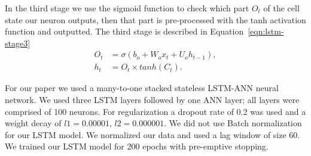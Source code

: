 \documentclass[12pt,journal,compsoc]{IEEEtran}
\begin{document}
\par In the third stage we use the sigmoid function to check which part $O_t$ of the cell state our neuron outputs,
then that part is pre-processed with the tanh activation function and outputted.
The third stage is described in Equation~\ref{eqn:lstm-stage3}
\begin{equation}
	\begin{aligned}
    O_t &= \sigma(b_o + W_o x_t + U_o h_{t-1}), \\
    h_t &= O_t \times tanh(C_t).
    \end{aligned}
    \label{eqn:lstm-stage3}
\end{equation}
\par For our paper we used a many-to-one stacked stateless LSTM-ANN neural network. 
We used three LSTM layers followed by one ANN layer; all layers were comprised of 100 neurons.
For regularization a dropout rate of 0.2 was used and a weight decay of $l1=0.00001$, $l2=0.000001$.
We did not use Batch normalization for our LSTM model.
We normalized our data and used a lag window of size 60.
We trained our LSTM model for 200 epochs with pre-emptive stopping. 
\end{document}
